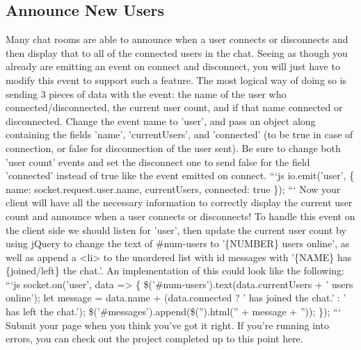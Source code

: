 \documentclass{article}%
\begin{document}
\subsection{Announce New Users}%
\label{subsec:AnnounceNewUsers}%
Many chat rooms are able to announce when a user connects or disconnects and then display that to all of the connected users in the chat. Seeing as though you already are emitting an event on connect and disconnect, you will just have to modify this event to support such a feature. The most logical way of doing so is sending 3 pieces of data with the event: the name of the user who connected/disconnected, the current user count, and if that name connected or disconnected.\newline%
Change the event name to 'user', and pass an object along containing the fields 'name', 'currentUsers', and 'connected' (to be true in case of connection, or false for disconnection of the user sent). Be sure to change both 'user count' events and set the disconnect one to send false for the field 'connected' instead of true like the event emitted on connect.\newline%
```js\newline%
io.emit('user', \{\newline%
  name: socket.request.user.name,\newline%
  currentUsers,\newline%
  connected: true\newline%
\});\newline%
```\newline%
Now your client will have all the necessary information to correctly display the current user count and announce when a user connects or disconnects! To handle this event on the client side we should listen for 'user', then update the current user count by using jQuery to change the text of \#num{-}users to '\{NUMBER\} users online', as well as append a <li> to the unordered list with id messages with '\{NAME\} has \{joined/left\} the chat.'.\newline%
An implementation of this could look like the following:\newline%
```js\newline%
socket.on('user', data => \{\newline%
  \$('\#num{-}users').text(data.currentUsers + ' users online');\newline%
  let message =\newline%
    data.name +\newline%
    (data.connected ? ' has joined the chat.' : ' has left the chat.');\newline%
  \$('\#messages').append(\$('').html('' + message + ''));\newline%
\});\newline%
```\newline%
Submit your page when you think you've got it right. If you're running into errors, you can check out the project completed up to this point here.\newline%
\end{document}
